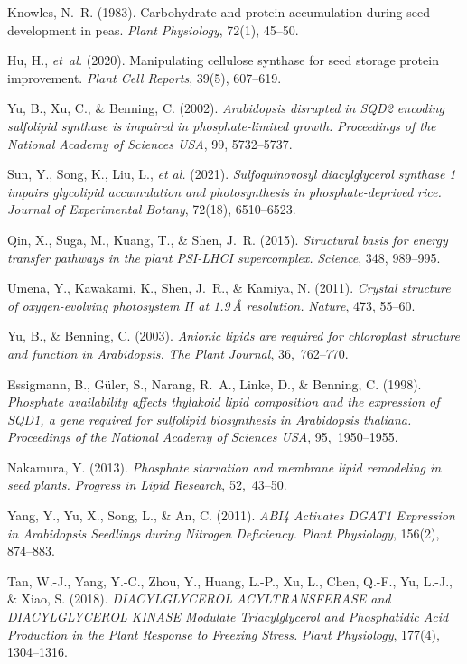 \documentclass[10pt,letterpaper]{article}
\begin{document}
\begin{itemize}
\begin{thebibliography}{10}
Knowles, N.~R. (1983).  
Carbohydrate and protein accumulation during seed development in peas.  
\emph{Plant Physiology}, 72(1), 45–50.

Hu, H., \emph{et~al.} (2020).  
Manipulating cellulose synthase for seed storage protein improvement.  
\emph{Plant Cell Reports}, 39(5), 607–619.


Yu, B., Xu, C., \& Benning, C. (2002).  
\emph{Arabidopsis disrupted in SQD2 encoding sulfolipid synthase is impaired in phosphate-limited growth.}  
\textit{Proceedings of the National Academy of Sciences USA}, 99, 5732–5737.

Sun, Y., Song, K., Liu, L., \emph{et al.} (2021).  
\emph{Sulfoquinovosyl diacylglycerol synthase 1 impairs glycolipid accumulation and photosynthesis in phosphate-deprived rice.}  
\textit{Journal of Experimental Botany}, 72(18), 6510–6523.

Qin, X., Suga, M., Kuang, T., \& Shen, J. R. (2015).  
\emph{Structural basis for energy transfer pathways in the plant PSI-LHCI supercomplex.}  
\textit{Science}, 348, 989–995.

Umena, Y., Kawakami, K., Shen, J. R., \& Kamiya, N. (2011).  
\emph{Crystal structure of oxygen-evolving photosystem II at 1.9 Å resolution.}  
\textit{Nature}, 473, 55–60.

Yu, B., \& Benning, C. (2003).  
\emph{Anionic lipids are required for chloroplast structure and function in Arabidopsis.}  
\textit{The Plant Journal}, 36, 762–770.

Essigmann, B., Güler, S., Narang, R. A., Linke, D., \& Benning, C. (1998).  
\emph{Phosphate availability affects thylakoid lipid composition and the expression of SQD1, a gene required for sulfolipid biosynthesis in Arabidopsis thaliana.}  
\textit{Proceedings of the National Academy of Sciences USA}, 95, 1950–1955.

Nakamura, Y. (2013).  
\emph{Phosphate starvation and membrane lipid remodeling in seed plants.}  
\textit{Progress in Lipid Research}, 52, 43–50.

Yang, Y., Yu, X., Song, L., \& An, C. (2011).  
\emph{ABI4 Activates DGAT1 Expression in Arabidopsis Seedlings during Nitrogen Deficiency.}  
\textit{Plant Physiology}, 156(2), 874–883.

Tan, W.-J., Yang, Y.-C., Zhou, Y., Huang, L.-P., Xu, L., Chen, Q.-F., Yu, L.-J., \& Xiao, S. (2018).  
\emph{DIACYLGLYCEROL ACYLTRANSFERASE and DIACYLGLYCEROL KINASE Modulate Triacylglycerol and Phosphatidic Acid Production in the Plant Response to Freezing Stress.}  
\textit{Plant Physiology}, 177(4), 1304–1316.


\end{thebibliography}
\end{itemize}
\end{document}
